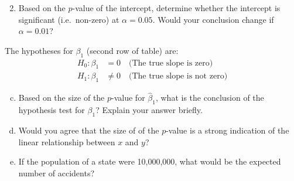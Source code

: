 \documentclass[11pt,twoside]{article}
\newcommand{\pts}[1]{\marginpar{ \small\hspace{0pt} \textit{[#1]} } }
\numberwithin{equation}{section}
\newcommand{\?}{\stackrel{?}{=}}
\begin{document}
 \begin{enumerate}[\bf (a)]\setcounter{enumi}{1}
 \item Based on the $p$-value \pts{2} of the intercept, determine whether the intercept is significant (i.e.\ non-zero) at $\alpha = 0.05$. Would your conclusion change if $\alpha = 0.01$?

   \vfill
 \end{enumerate}
 \eject
 
The hypotheses for $\beta_1$ (second row of table) are:
 \begin{align*}
   H_0: \beta_1 &= 0 \quad \text{(The true slope is zero)} \\
   H_1 : \beta_1 &\ne 0 \quad \text{(The true slope is not zero)}
 \end{align*}
 \begin{enumerate}[(a)]\setcounter{enumi}{2}
 \item Based on the size of the $p$-value for $\hat\beta_1$, \pts{2} what is the conclusion of the hypothesis test for $\beta_1$? Explain your answer briefly.
   \vspace{25ex}
   
 \item Would you \pts{1} agree that the size of of the $p$-value is a strong indication of the linear relationship between $x$ and $y$?
   \vspace{15ex}
   
 \item If the \pts{2}  population of a state were 10,000,000, what would be the expected number of accidents?
   
 \end{enumerate}

 \eject
\end{document}
